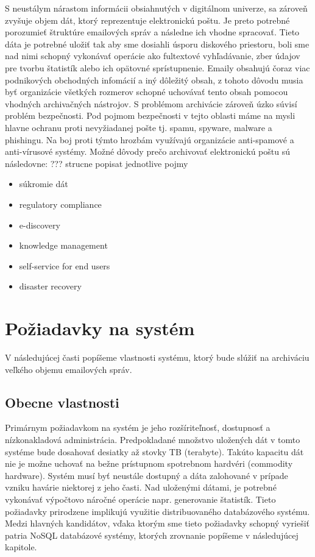 \documentclass[11pt,twoside,a4paper]{book}
\begin{document}
S neustálym nárastom informácii obsiahnutých v digitálnom univerze, sa zároveň zvyšuje objem dát, ktorý reprezentuje elektronickú poštu. Je preto potrebné porozumieť štruktúre emailových správ a následne ich vhodne spracovať. Tieto dáta je potrebné uložiť tak aby sme dosiahli úsporu diskového priestoru, boli sme nad nimi schopný vykonávať operácie ako fultextové vyhľadávanie, zber údajov pre tvorbu štatistík alebo ich opätovné sprístupnenie. Emaily obsahujú čoraz viac podnikových obchodných infomácií a iný dôležitý obsah, z tohoto dôvodu musia byť organizácie všetkých rozmerov schopné uchovávať tento obsah pomocou vhodných archivačných nástrojov. S problémom archivácie zároveň úzko súvisí problém bezpečnosti. Pod pojmom bezpečnosti v tejto oblasti máme na mysli hlavne ochranu proti nevyžiadanej pošte tj. spamu, spyware, malware a phishingu. Na boj proti týmto hrozbám využívajú organizácie anti-spamové a anti-vírusové systémy. Možné dôvody prečo archivovať elektronickú poštu sú následovne:
??? strucne popisat jednotlive pojmy
\begin{itemize}
 \item 
 súkromie dát
 \item
 regulatory compliance
 \item
 e-discovery
 \item
 knowledge management
 \item 
 self-service for end users
 \item
 disaster recovery
\end{itemize}


\section{Požiadavky na systém}

V následujúcej časti popíšeme vlastnosti systému, ktorý bude slúžiť na archiváciu veľkého objemu emailových správ.

\subsection{Obecne vlastnosti}

Primárnym požiadavkom na systém je jeho rozšíriteľnosť, dostupnosť a nízkonakladová administrácia. Predpokladané množstvo uložených dát v tomto systéme bude dosahovať desiatky až stovky TB (terabyte). Takúto kapacitu dát nie je možne uchovať na bežne prístupnom spotrebnom hardvéri (commodity hardware). Systém musí byť neustále dostupný a dáta zalohované v prípade vzniku havárie niektorej z jeho časti. Nad uloženými dátami, je potrebné vykonávať výpočtovo náročné operácie napr. generovanie štatistík. Tieto požiadavky prirodzene implikujú využitie distribuovaného databázového systému. Medzi hlavných kandidátov, vďaka ktorým sme tieto požiadavky schopný vyriešiť patria NoSQL databázové systémy, ktorých zrovnanie popíšeme v následujúcej kapitole.
\end{document}
